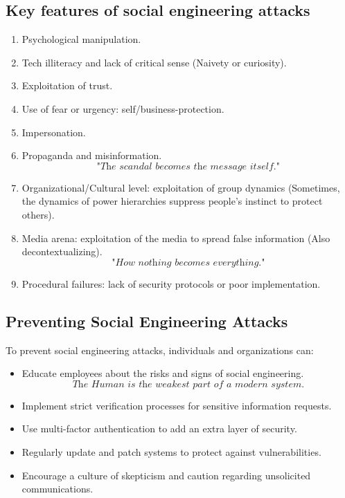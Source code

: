 \subsection*{Key features of social engineering attacks}
\begin{enumerate}
    \item Psychological manipulation.
    \item Tech illiteracy and lack of critical sense (Naivety or curiosity).
    \item Exploitation of trust.
    \item Use of fear or urgency: self/business-protection. 
    \item Impersonation.
    \item Propaganda and misinformation.
    \[
        \textit{"The scandal becomes the message itself."}
    \]
    \item Organizational/Cultural level: exploitation of group dynamics (Sometimes, the dynamics of power hierarchies suppress people’s instinct to protect others).
    \item Media arena: exploitation of the media to spread false information (Also decontextualizing).
    \[
        \textit{"How nothing becomes everything."}
    \]
    \item Procedural failures: lack of security protocols or poor implementation.
\end{enumerate}

\subsection*{Preventing Social Engineering Attacks}

To prevent social engineering attacks, individuals and organizations can:
\begin{itemize}
    \item Educate employees about the risks and signs of social engineering.
    \[
        \textit{The Human is the weakest part of a modern system.}
    \]
    \item Implement strict verification processes for sensitive information requests.
    \item Use multi-factor authentication to add an extra layer of security.
    \item Regularly update and patch systems to protect against vulnerabilities.
    \item Encourage a culture of skepticism and caution regarding unsolicited communications.
\end{itemize}

